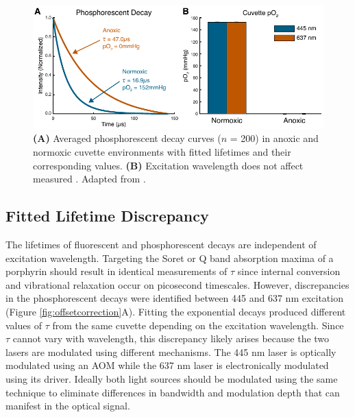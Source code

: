 \begin{figure}
    \includegraphics{figures/chapter_2/cuvette.pdf}
    \caption[\textbf{(A)} Averaged phosphorescent decay curves ($n$ = 200) in anoxic and normoxic cuvette environments with fitted lifetimes and their corresponding  values. \textbf{(B)} Excitation wavelength does not affect measured .]{
        \label{fig:cuvette}
        \textbf{(A)} Averaged phosphorescent decay curves ($n$ = 200) in anoxic and normoxic cuvette environments with fitted lifetimes and their corresponding  values. \textbf{(B)} Excitation wavelength does not affect measured . Adapted from \cite{Sullender:2018ff}.
    }
\end{figure}

\subsection{Fitted Lifetime Discrepancy}

The lifetimes of fluorescent and phosphorescent decays are independent of excitation wavelength. Targeting the Soret or Q band absorption maxima of a porphyrin should result in identical measurements of $\tau$ since internal conversion and vibrational relaxation occur on picosecond timescales. However, discrepancies in the phosphorescent decays were identified between 445 and 637 nm excitation (Figure \ref{fig:offsetcorrection}A). Fitting the exponential decays produced different values of $\tau$ from the same cuvette depending on the excitation wavelength. Since $\tau$ cannot vary with wavelength, this discrepancy likely arises because the two lasers are modulated using different mechanisms. The 445 nm laser is optically modulated using an AOM while the 637 nm laser is electronically modulated using its driver. Ideally both light sources should be modulated using the same technique to eliminate differences in bandwidth and modulation depth that can manifest in the optical signal.

